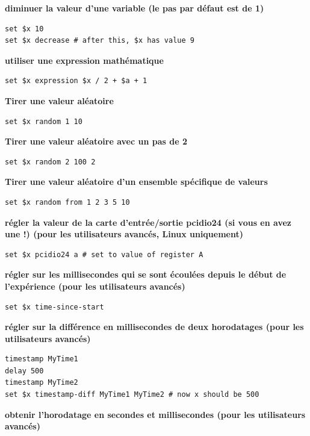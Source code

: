 \documentclass[
]{book}
\begin{document}
\textbf{diminuer la valeur d'une variable (le pas par défaut est de 1)}

\begin{verbatim}
set $x 10
set $x decrease # after this, $x has value 9
\end{verbatim}

\textbf{utiliser une expression mathématique}

\begin{verbatim}
set $x expression $x / 2 + $a + 1
\end{verbatim}

\textbf{Tirer une valeur aléatoire}

\begin{verbatim}
set $x random 1 10
\end{verbatim}

\textbf{Tirer une valeur aléatoire avec un pas de 2}

\begin{verbatim}
set $x random 2 100 2
\end{verbatim}

\textbf{Tirer une valeur aléatoire d'un ensemble spécifique de valeurs}

\begin{verbatim}
set $x random from 1 2 3 5 10
\end{verbatim}

\textbf{régler la valeur de la carte d'entrée/sortie pcidio24 (si vous en avez une !) (pour les utilisateurs avancés, Linux uniquement)}

\begin{verbatim}
set $x pcidio24 a # set to value of register A
\end{verbatim}

\textbf{régler sur les millisecondes qui se sont écoulées depuis le début de l'expérience (pour les utilisateurs avancés)}

\begin{verbatim}
set $x time-since-start
\end{verbatim}

\textbf{régler sur la différence en millisecondes de deux horodatages (pour les utilisateurs avancés)}

\begin{verbatim}
timestamp MyTime1
delay 500
timestamp MyTime2
set $x timestamp-diff MyTime1 MyTime2 # now x should be 500
\end{verbatim}

\textbf{obtenir l'horodatage en secondes et millisecondes (pour les utilisateurs avancés)}
\end{document}
